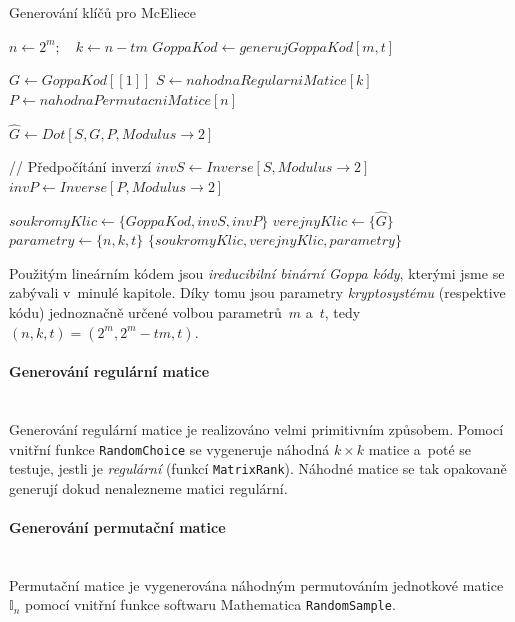 \documentclass[thesis=M,czech,hidelinks]{FITthesis}[2012/06/26]
\newcommand{\0}{{\textcolor[gray]{0.75}{0}}}
\newenvironment{algoritmus}{
    \floatname{algorithm}{Algoritmus}
    \begin{algorithm}
}{\end{algorithm}}
\begin{document}
\begin{algoritmus}[!ht]
    \caption{Generování klíčů pro McEliece}
    \begin{algorithmic}[1]
        \State $ n \gets 2^m ; \quad k \gets n - tm $
        \State $ GoppaKod \gets generujGoppaKod[ m, t ] $

        \hfil

        \State $ G \gets GoppaKod[[1]] $
        \State $ S \gets nahodnaRegularniMatice[k] $
        \State $ P \gets nahodnaPermutacniMatice[n] $

        \hfil
        \State $ \hat{G} \gets Dot[ S, G, P, Modulus\to2 ] $

        // Předpočítání inverzí
        \State $ invS \gets Inverse[ S, Modulus\to2 ] $
        \State $ invP \gets Inverse[ P, Modulus\to2 ] $

        \hfil
        \State $ soukromyKlic \gets \{ GoppaKod, invS, invP \} $
        \State $ verejnyKlic  \gets \{ \hat{G} \} $
        \State $ parametry    \gets \{ n, k, t \} $
        \State \Return $ \{ soukromyKlic, verejnyKlic, parametry \} $
     \EndFunction
    \end{algorithmic}
\end{algoritmus}

Použitým lineárním kódem jsou \emph{ireducibilní binární Goppa kódy}, kterými
jsme se zabývali v~minulé kapitole. Díky tomu jsou parametry
\emph{kryptosystému} (respektive kódu) jednoznačně určené volbou parametrů~$m$
a~$t$, tedy $(n,k,t) = (2^m, 2^m - tm, t)$.


\paragraph{Generování regulární matice} \hfil \\
Generování regulární matice je realizováno velmi primitivním způsobem. Pomocí
vnitřní funkce \texttt{RandomChoice} se vygeneruje náhodná $k \times k$ matice
a~poté se testuje, jestli je \emph{regulární} (funkcí \texttt{MatrixRank}).
Náhodné matice se tak opakovaně generují dokud nenalezneme matici regulární.


\paragraph{Generování permutační matice} \hfil \\
Permutační matice je vygenerována náhodným permutováním jednotkové
matice~$\mathbb{I}_n$ pomocí vnitřní funkce softwaru Mathematica
\texttt{RandomSample}.
\end{document}
